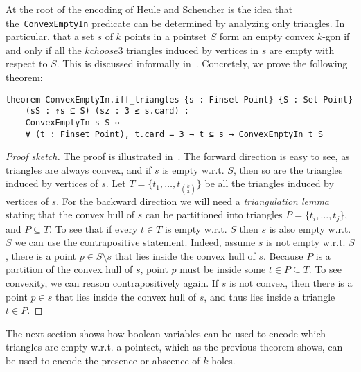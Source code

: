 At the root  of the encoding of Heule and Scheucher is the idea that the~\lstinline|ConvexEmptyIn| predicate can be determined by analyzing only triangles. In particular, that a set $s$ of $k$ points in a pointset $S$ form an empty convex $k$-gon if and only if all the ${k choose 3}$ triangles induced by vertices in $s$ are empty with respect to $S$. This is discussed informally in~\cite[Section 3, Eq. 4]{emptyHexagonNumber}.
Concretely, we prove the following theorem:
\begin{lstlisting}
theorem ConvexEmptyIn.iff_triangles {s : Finset Point} {S : Set Point}
    (sS : ↑s ⊆ S) (sz : 3 ≤ s.card) :
    ConvexEmptyIn s S ↔
    ∀ (t : Finset Point), t.card = 3 → t ⊆ s → ConvexEmptyIn t S
\end{lstlisting}

\begin{proof}[Proof sketch]
    The proof is illustrated in~.
    The forward direction is easy to see, as triangles are always convex, and if $s$ is empty w.r.t. $S$, then so are the triangles induced by vertices of $s$.
    Let $T = \{t_1, \ldots, t_{{k \choose 3}}\}$ be all the triangles induced by vertices of $s$.
   For the backward direction we will need a \emph{triangulation lemma} stating that the convex hull of $s$ can be partitioned into triangles $P = \{t_i, \ldots, t_j\}$, and $P \subseteq T$.
    To see that if every $t \in T$ is empty w.r.t. $S$ then $s$ is also empty w.r.t. $S$ we can use the contrapositive statement.
     Indeed, assume $s$ is not empty w.r.t. $S$, there is a point $p \in S \setminus s$ that lies inside the convex hull of $s$. Because $P$ is a partition of the convex hull of $s$, point $p$ must be inside some $t \in P \subseteq T$.
     To see convexity, we can reason contrapositively again. If $s$ is not convex, then there is a point $p \in s$ that lies inside the convex hull of $s$, and thus lies inside a triangle $t \in P$.
\end{proof}

The next section shows how boolean variables can be used to encode which triangles are empty w.r.t. a pointset, which as the previous theorem shows, can be used to encode the presence or abscence of $k$-holes.




